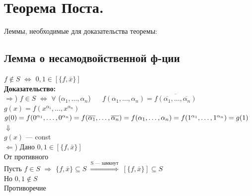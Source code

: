 \documentclass[12pt]{article}
\begin{document}
\section{Теорема Поста.}
Леммы, необходимые для доказательства теоремы:
\subsection{Лемма о несамодвойственной ф-ции}
	$f \notin S$ $\Leftrightarrow$ $0,1 \in [\{f, \bar{x}\}]$\\
	\textbf{Доказательство:}\\
		$\Rightarrow$) $f \in S$ $\Leftrightarrow$ $\forall$ ($\alpha_1,\dotsc,\alpha_n$) $\quad$ $f(\alpha_1,\dotsc,\alpha_n) = \overline{f(\overline{\alpha_1},\dotsc,\overline{\alpha_n})}$\\
		$g(x) = f(x^{\alpha_1},\dotsc,x^{\alpha_n})$\\
		$g(0) = f(0^{\alpha_1},\dotsc,0^{\alpha_n}) = f(\overline{\alpha_1},\dotsc,\overline{\alpha_n}) = \*f(\alpha_1,\dotsc,\alpha_n) = f(1^{\alpha_1},\dotsc,1^{\alpha_n}) = g(1)$\\
		$\Downarrow$\\
		$g(x)$	— const\\
		$\Leftarrow$) Дано $0,1 \in [\{f, \bar{x}\}]$\\
		От противного\\
		Пусть $f \in S$ $\Rightarrow$ $\{f, \bar{x}\} \subseteq S$ $\overset{\text{S — замкнут}}{\Rightarrow}$ $[\{f, \bar{x}\}] \subseteq S$\\
		Но $0,1 \notin S$\\
		Противоречие\\
	\qedsymbol
\end{document}
